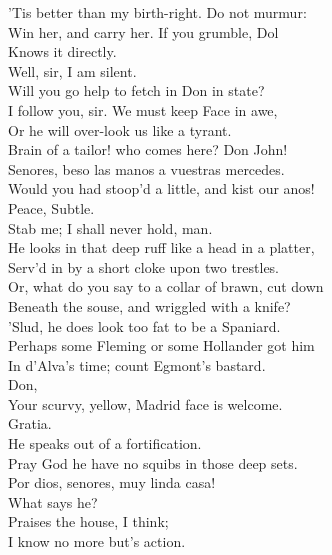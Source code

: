\documentclass[a4paper,oneside]{memoir}
\begin{document}
\begin{drama*}
'Tis better than my birth-right. Do not murmur:\\
Win her, and carry her. If you grumble, Dol\\
Knows it directly.\\
\facespeaks {} Well, sir, I am silent.\\
Will you go help to fetch in Don in state?\\
\subtlespeaks I follow you, sir. We must keep Face in awe,\\
Or he will over-look us like a tyrant.\\
Brain of a tailor! who comes here? Don John!\\
\surlyspeaks Senores, beso las manos a vuestras mercedes.\\
\subtlespeaks Would you had stoop'd a little, and kist our anos!\\
\facespeaks Peace, Subtle.\\
\subtlespeaks {} Stab me; I shall never hold, man.\\
He looks in that deep ruff like a head in a platter,\\
Serv'd in by a short cloke upon two trestles.\\
\facespeaks Or, what do you say to a collar of brawn, cut down\\
Beneath the souse, and wriggled with a knife?\\
\subtlespeaks 'Slud, he does look too fat to be a Spaniard.\\
\facespeaks Perhaps some Fleming or some Hollander got him\\
In d'Alva's time; count Egmont's bastard.\\
\subtlespeaks {} Don,\\
Your scurvy, yellow, Madrid face is welcome.\\
\surlyspeaks Gratia.\\
\subtlespeaks {} He speaks out of a fortification.\\
Pray God he have no squibs in those deep sets.\\
\surlyspeaks Por dios, senores, muy linda casa!\\
\subtlespeaks What says he?\\
\facespeaks {} Praises the house, I think;\\
I know no more but's action.\\

\end{drama*}
\end{document}
